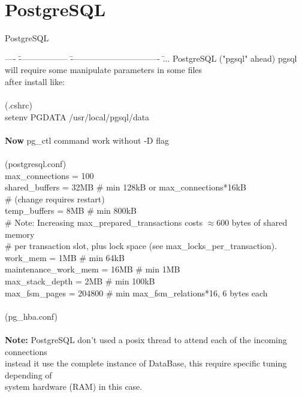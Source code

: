\documentclass[xcolor=dvipsnames]{beamer}
\begin{document}
\section{PostgreSQL}

	\begin{frame}{PostgreSQL}
	\tiny
	{
	\begin{tabbing}
		---- \= ------------------ \= -------------------------------- \= ... \kill
		PostgreSQL ("pgsql" ahead) pgsql will require some manipulate parameters in some files \\
		after install like: \\ \\		
		(.cshrc) \\
		\>setenv  PGDATA  /usr/local/pgsql/data \\ \\
		\textbf{Now} pg\_ctl command work without -D flag\\ \\
		(postgresql.conf) \\
		\>max\_connections = 100 \\ 
		\>shared\_buffers = 32MB \>\>   \# min 128kB or max\_connections*16kB \\
        \>\>\>                          \# (change requires restart) \\
		\>temp\_buffers = 8MB \>\>		\# min 800kB \\
		\>\>\> \# Note:  Increasing max\_prepared\_transactions costs $\approx$600 bytes of shared memory \\
		\>\>\> \# per transaction slot, plus lock space (see max\_locks\_per\_transaction).\\
		\>work\_mem = 1MB                 \>\>        \# min 64kB\\
		\>maintenance\_work\_mem = 16MB      \>\>      \# min 1MB\\
		\>max\_stack\_depth = 2MB            \>\>     \# min 100kB\\
		\>max\_fsm\_pages = 204800 			\>\> \# min max\_fsm\_relations*16, 6 bytes each\\ \\
		(pg\_hba.conf)\\ \\

		\textbf{Note:} PostgreSQL don't used a posix thread to attend each of the incoming connections \\
		instead it use the complete instance of DataBase, this require specific tuning depending of 	\\ 
		system hardware (RAM) in this case. \\
	\end{tabbing}
	}
	\end{frame}
	
\end{document}

